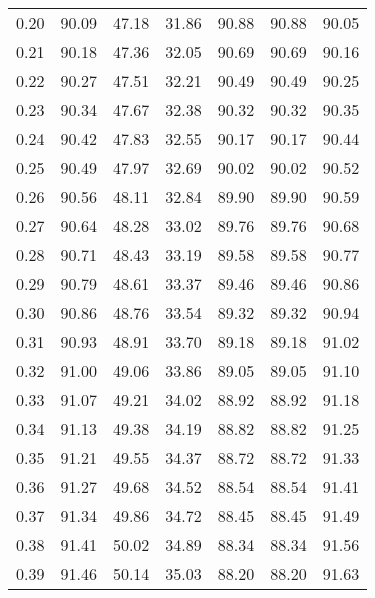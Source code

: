 \begin{tabular}{|c|c|c|c|c|c|c|}
      0.20 &     90.09 &     47.18 &      31.86 &   90.88 &      90.88 &         90.05 \\
      0.21 &     90.18 &     47.36 &      32.05 &   90.69 &      90.69 &         90.16 \\
      0.22 &     90.27 &     47.51 &      32.21 &   90.49 &      90.49 &         90.25 \\
      0.23 &     90.34 &     47.67 &      32.38 &   90.32 &      90.32 &         90.35 \\
      0.24 &     90.42 &     47.83 &      32.55 &   90.17 &      90.17 &         90.44 \\
      0.25 &     90.49 &     47.97 &      32.69 &   90.02 &      90.02 &         90.52 \\
      0.26 &     90.56 &     48.11 &      32.84 &   89.90 &      89.90 &         90.59 \\
      0.27 &     90.64 &     48.28 &      33.02 &   89.76 &      89.76 &         90.68 \\
      0.28 &     90.71 &     48.43 &      33.19 &   89.58 &      89.58 &         90.77 \\
      0.29 &     90.79 &     48.61 &      33.37 &   89.46 &      89.46 &         90.86 \\
      0.30 &     90.86 &     48.76 &      33.54 &   89.32 &      89.32 &         90.94 \\
      0.31 &     90.93 &     48.91 &      33.70 &   89.18 &      89.18 &         91.02 \\
      0.32 &     91.00 &     49.06 &      33.86 &   89.05 &      89.05 &         91.10 \\
      0.33 &     91.07 &     49.21 &      34.02 &   88.92 &      88.92 &         91.18 \\
      0.34 &     91.13 &     49.38 &      34.19 &   88.82 &      88.82 &         91.25 \\
      0.35 &     91.21 &     49.55 &      34.37 &   88.72 &      88.72 &         91.33 \\
      0.36 &     91.27 &     49.68 &      34.52 &   88.54 &      88.54 &         91.41 \\
      0.37 &     91.34 &     49.86 &      34.72 &   88.45 &      88.45 &         91.49 \\
      0.38 &     91.41 &     50.02 &      34.89 &   88.34 &      88.34 &         91.56 \\
      0.39 &     91.46 &     50.14 &      35.03 &   88.20 &      88.20 &         91.63 \\

\end{tabular}

